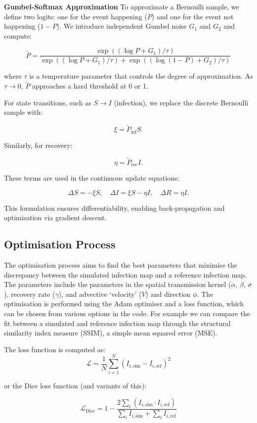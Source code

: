 \documentclass[12pt]{article}
\begin{document}
{\bf Gumbel-Softmax Approximation} To approximate a Bernoulli sample, we define two logits: one for the event happening (\( P \)) and one for the event not happening (\( 1 - P \)). We introduce independent Gumbel noise \( G_1 \) and \( G_2 \) and compute:

\[
\tilde{P} = \frac{\exp\left((\log P + G_1)/\tau\right)}{\exp\left((\log P + G_1)/\tau\right) + \exp\left((\log (1-P) + G_2)/\tau\right)}
\]

where \( \tau \) is a temperature parameter that controls the degree of approximation. As \( \tau \to 0 \), \( \tilde{P} \) approaches a hard threshold at 0 or 1.

For state transitions, such as \( S \to I \) (infection), we replace the discrete Bernoulli sample with:

\[
\xi = \tilde{P}_{\text{inf}} S.
\]

Similarly, for recovery:

\[
\eta = \tilde{P}_{\text{rec}} I.
\]

These terms are used in the continuous update equations:

\[
\Delta S = -\xi S, \quad \Delta I = \xi S - \eta I, \quad \Delta R = \eta I.
\]

This formulation ensures differentiability, enabling back-propagation and optimisation via gradient descent.

\subsection{Optimisation Process}
The optimisation process aims to find the best parameters that minimise the discrepancy between the simulated infection map and a reference infection map. The parameters include the parameters in the spatial transmission  kernel ($\alpha$, $\beta$, $\sigma$), recovery rate ($\gamma$), and advective `velocity' ($V$) and direction $\phi$. The optimisation is performed using the Adam optimiser and a loss function, which can be chosen from various options in the code. For example we can compare the fit between a simulated and reference infection map through the structural similarity index measure (SSIM),  a simple mean squared error (MSE).

The loss function is computed as:
\[
\mathcal{L}= \frac{1}{N} \sum_{i=1}^{N} (I_{i, \text{sim}} - I_{i, \text{ref}})^2
\]

or the Dice loss function (and variants of this):

\[
\mathcal{L}_{\text{Dice}} = 1 - \frac{2 \sum_{i} (I_{i, \text{sim}} \cdot I_{i, \text{ref}})}{\sum_{i} I_{i, \text{sim}} + \sum_{i} I_{i, \text{ref}}}
\]
\end{document}
